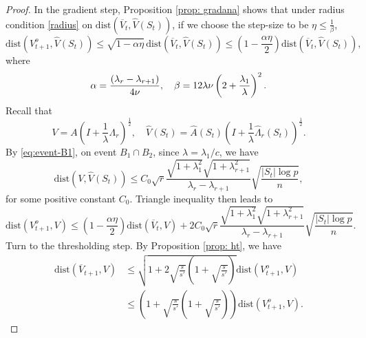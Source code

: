 \documentclass[11pt]{article}
\newcommand{\nb}[1]{\textcolor{orange}{\texttt{[#1]}}}
\newcommand{\gsc}[1]{\textcolor{blue}{\texttt{[#1]}}}
\newcommand{\rev}[1]{\textcolor{black}{#1}}
\newcommand{\ha}{\widehat{A}}
\newcommand{\hl}{\widehat{\Lambda}_r}
\newcommand{\hs}{s'}
\newcommand{\scale}{V}
\newcommand{\hU}{\widehat{V}}
\newcommand{\gd}{\overline{V}}
\newcommand{\dist}{\mathrm{dist}}
\newcommand{\0}{{\mathbf{0}}}
\begin{document}
\begin{proof}
In the gradient step, Proposition \ref{prop: gradana} shows that under radius condition \eqref{radius} on $\dist(\gd_t, \hU(S_t))$,
if we choose the step-size to be $\eta\leq\frac{1}{\beta}$, 
\begin{equation*}
\mathrm{dist}(V_{t+1}^o, \hU(S_t))\leq\sqrt{1-\alpha\eta}\,\mathrm{dist}(\gd_t,\hU(S_t))
\leq \left(1-\frac{\alpha\eta}{2} \right)\mathrm{dist}(\gd_t,\hU(S_t)),
\end{equation*}
where \begin{equation*}
   \alpha=\frac{(\lambda_r-\lambda_{r+1})}{4\rev{\nu}},\quad \beta=12\lambda\rev{\nu}\left(2+\frac{\lambda_1}{\lambda}\right)^2.
\end{equation*}
Recall that 
\begin{equation*}
    \scale=A\left(I+\frac{1}{\lambda}\Lambda_r\right)^{\frac{1}{2}},\quad \widehat{V}(S_t)=\ha(S_t)\left(I+\frac{1}{\lambda}\hl(S_t)\right)^{\frac{1}{2}}.
\end{equation*}
By \eqref{eq:event-B1}, on event $B_1\cap B_2$, since $\lambda = {\lambda_1}/{c}$, we have
\begin{equation*}
\mathrm{dist}(\scale, \widehat{V}(S_t))\leq C_0\sqrt{r}\frac{\sqrt{1+\lambda_1^2}\sqrt{{1+\lambda_{r+1}^2}}}{\lambda_r-\lambda_{r+1}}\sqrt{\frac{|S_t|\log p}{n}},
\end{equation*}
for some positive constant $C_0$.
Triangle inequality then leads to
\begin{equation*}
\mathrm{dist}(V_{t+1}^o, \scale)\leq\left(1-\frac{\alpha\eta}{2} \right)\mathrm{dist}(\gd_t,\scale)+2C_0\sqrt{r}\frac{\sqrt{1+\lambda_1^2}\sqrt{{1+\lambda_{r+1}^2}}}{\lambda_r-\lambda_{r+1}}\sqrt{\frac{|S_t|\log p}{n}}.
\end{equation*}
Turn to the thresholding step.
By Proposition \ref{prop: ht}, we have
\begin{align*}
\mathrm{dist}(\gd_{t+1},\scale)
& \leq  
\sqrt{1+2\sqrt{\frac{s}{\hs}}\left(1+\sqrt{\frac{s}{\hs}}\right)} \mathrm{dist}(V_{t+1}^o,\scale)\\
& \leq\left(1+\sqrt{\frac{s}{\hs}}\left(1+\sqrt{\frac{s}{\hs}}\right)\right)\mathrm{dist}(V_{t+1}^o,\scale). 
\end{align*}


\end{proof}
\end{document}
